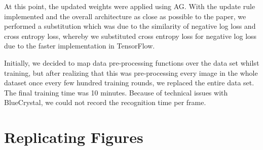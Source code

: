 \documentclass[conference]{IEEEtran}
\begin{document}
At this point, the updated weights were applied using AG. With the update rule implemented and the overall architecture as close as possible to the paper, we performed a substitution which was due to the similarity of negative log loss and cross entropy loss, whereby we substituted cross entropy loss for negative log loss due to the faster implementation in TensorFlow.

Initially, we decided to map data pre-processing functions over the data set whilst training, but after realizing that this was pre-processing every image in the whole dataset once every few hundred training rounds, we replaced the entire data set. The final training time was 10 minutes. Because of technical issues with BlueCrystal, we could not record the recognition time per frame.

\section{Replicating Figures}
\end{document}
